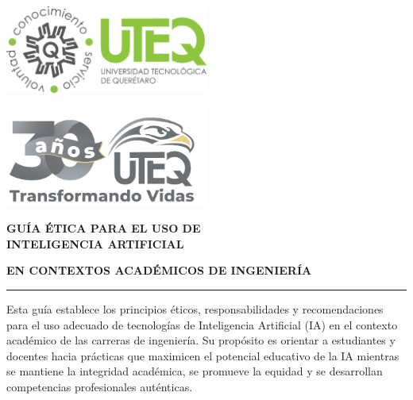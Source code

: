 \documentclass[11pt, letterpaper]{article}
\begin{document}
	
	\begin{center}
		\begin{minipage}{0.45\textwidth}
			\begin{center}
				\includegraphics[width=0.5\textwidth]{Imagenes/Logo_uteq.png}
			\end{center}
		\end{minipage}%
		\hfill
		\begin{minipage}{0.45\textwidth}
			\begin{center}
				\includegraphics[width=0.5\textwidth]{Imagenes/Logo_uteq_30.png}
			\end{center}
		\end{minipage}
		
		{\color{uteqGreen}\huge\bfseries GUÍA ÉTICA PARA EL USO DE\\
			\vspace{0.15cm}
			INTELIGENCIA ARTIFICIAL}
		
		\vspace{0.3cm}
		{\large\bfseries EN CONTEXTOS ACADÉMICOS DE INGENIERÍA}
		
		\vspace{0.5cm}
		\rule{\textwidth}{3pt}
	\end{center}
	
	\begin{tcolorbox}[colback=uteqGreen!10, colframe=uteqGreen, title=Presentación]
		Esta guía establece los principios éticos, responsabilidades y recomendaciones para el uso adecuado de tecnologías de Inteligencia Artificial (IA) en el contexto académico de las carreras de ingeniería. Su propósito es orientar a estudiantes y docentes hacia prácticas que maximicen el potencial educativo de la IA mientras se mantiene la integridad académica, se promueve la equidad y se desarrollan competencias profesionales auténticas.
	\end{tcolorbox}
	
\end{document}
